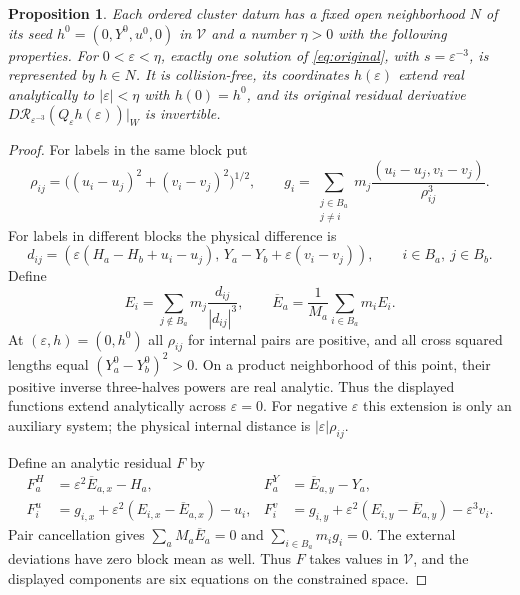 \documentclass[11pt,a4paper]{amsart}
\newtheorem{proposition}[theorem]{Proposition}
\numberwithin{equation}{section}
\newcommand{\eps}{\varepsilon}
\newcommand{\cR}{\mathcal R}
\newcommand{\cV}{\mathcal V}
\begin{document}
\begin{proposition}\label{prop:local-branches}
Each ordered cluster datum has a fixed open neighborhood $N$ of its
seed $h^0=(0,Y^0,u^0,0)$ in $\cV$ and a number $\eta>0$ with the
following properties. For $0<\eps<\eta$, exactly one solution of
\eqref{eq:original}, with $s=\eps^{-3}$, is represented by $h\in N$.
It is collision-free, its coordinates $h(\eps)$ extend real analytically
to $|\eps|<\eta$ with $h(0)=h^0$, and its original residual derivative
$D\cR_{\eps^{-3}}(Q_\eps h(\eps))|_W$ is invertible.
\end{proposition}
\begin{proof}
For labels in the same block put
\[
 \rho_{ij}=\big((u_i-u_j)^2+(v_i-v_j)^2\big)^{1/2},\qquad
 g_i=\sum_{\substack{j\in B_a\\j\ne i}}
                   m_j\frac{(u_i-u_j,v_i-v_j)}{\rho_{ij}^3}.
\]
For labels in different blocks the physical difference is
\begin{equation}\label{eq:cross-difference}
 d_{ij}=(\eps(H_a-H_b+u_i-u_j),\,
                    Y_a-Y_b+\eps(v_i-v_j)),\qquad i\in B_a,
                    \ j\in B_b.
\end{equation}
Define
\[
 E_i=\sum_{j\notin B_a}m_j\frac{d_{ij}}{|d_{ij}|^3},\qquad
 \overline E_a=\frac1{M_a}\sum_{i\in B_a}m_iE_i.
\]
At $(\eps,h)=(0,h^0)$ all $\rho_{ij}$ for internal pairs are positive,
and all cross squared lengths equal $(Y_a^0-Y_b^0)^2>0$. On a product
neighborhood of this point, their positive inverse three-halves powers
are real analytic. Thus the displayed functions extend analytically
across $\eps=0$. For negative $\eps$ this extension is only an auxiliary
system; the physical internal distance is $|\eps|\rho_{ij}$.

Define an analytic residual $F$ by
\begin{align}
 F^H_a&=\eps^2\overline E_{a,x}-H_a,&
 F^Y_a&=\overline E_{a,y}-Y_a,\label{eq:outer-residual}\\
 F^u_i&=g_{i,x}+\eps^2(E_{i,x}-\overline E_{a,x})-u_i,&
 F^v_i&=g_{i,y}+\eps^2(E_{i,y}-\overline E_{a,y})-\eps^3v_i.
 \label{eq:inner-residual}
\end{align}
Pair cancellation gives $\sum_aM_a\overline E_a=0$ and
$\sum_{i\in B_a}m_ig_i=0$. The external deviations have zero block
mean as well. Thus $F$ takes values in $\cV$, and the displayed
components are six equations on the constrained space.


\end{proof}
\end{document}
